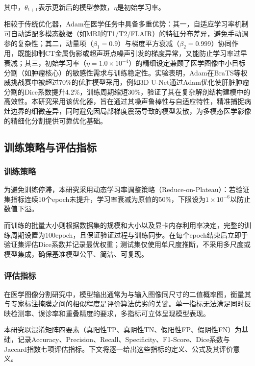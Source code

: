 其中，$\theta_{t+1}$表示更新后的模型参数，$\eta$是初始学习率。

相较于传统优化器，Adam在医学任务中具备多重优势：其一，自适应学习率机制可自动适配多模态数据（如MRI的T1/T2/FLAIR）的特征分布差异，避免手动调参的复杂性；其二，动量项（\( \beta_1=0.9 \)）与梯度平方衰减（\( \beta_2=0.999 \)）协同作用，既能抑制CT金属伪影或超声斑点噪声引发的梯度异常，又能防止学习率过早衰减；其三，初始学习率（\( \eta=1.0 \times 10^{-4} \)）的精细设定兼顾了医学图像中小目标分割（如肿瘤核心）的敏感性需求与训练稳定性。实验表明，Adam在BraTS等权威挑战赛中被超过70\%的优胜模型采用，例如3D U-Net通过Adam优化使肝脏肿瘤分割的Dice系数提升4.2\%，训练周期缩短30\%，验证了其在复杂解剖结构建模中的高效性。本研究采用该优化器，旨在通过其噪声鲁棒性与自适应特性，精准捕捉病灶边界的细微差异，同时避免因局部梯度震荡导致的模型发散，为多模态医学影像的精细化分割提供可靠优化基础。

\subsection{训练策略与评估指标}

\subsubsection{训练策略}

为避免训练停滞，本研究采用动态学习率调整策略（Reduce-on-Plateau）：若验证集指标连续10个epoch未提升，学习率衰减为原值的50\%，下限设为$1 \times 10^{-6}$以防止数值下溢。

而训练的批量大小则根据数据集的规模和大小以及显卡内存利用率决定，完整的训练周期设置为100epoch，且保证验证过程与训练同步。在每个epoch结束后立即于验证集评估Dice系数并记录最优权重；测试集仅使用单尺度推断，不采用多尺度或模型集成，确保基准模型公平、简洁、可复现。

\subsubsection{评估指标}

在医学图像分割研究中，模型输出通常为与输入图像同尺寸的二值概率图，衡量其与专家标注掩膜之间的相似程度是评价算法优劣的关键。单一指标无法满足同时反映检测率、误诊率和重叠精度的要求，多指标可立体呈现模型表现。

本研究以混淆矩阵四要素（真阳性TP、真阴性TN、假阳性FP、假阴性FN）为基础，记录Accuracy、Precision、Recall、Specificity、F1-Score、Dice系数与Jaccard指数七项评估指标。下文将逐一给出这些指标的定义、公式及其评价意义。

